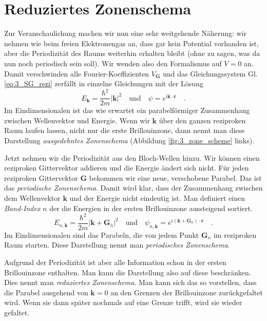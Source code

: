 \section{Reduziertes Zonenschema}

Zur Veranschaulichung machen wir nun eine sehr weitgehende Näherung: wir nehmen wie beim freien Elektronengas an, dass gar kein Potential vorhanden ist, aber die Periodizität des Raums weiterhin erhalten bleibt (ohne zu sagen, was da nun noch periodisch sein soll). Wir wenden also den Formalismus auf $V=0$ an. Damit verschwinden alle Fourier-Koeffizienten $V_\mathbf{G}$ und das Gleichungssystem Gl. \ref{eq:3_SG_rezi} zerfällt in einzelne Gleichungen mit der Lösung
\begin{equation}
    E_\mathbf{k} = \frac{\hbar^2}{2m} \left| \mathbf{k}  \right|^2 
    \quad \text{und} \quad 
    \psi = e^{i \mathbf{k} \cdot \mathbf{r}} \quad .
\end{equation}
Im Eindimensionalen ist das  wie erwartet ein parabelförmiger Zusammenhang zwischen Wellenvektor und Energie. Wenn wir $\mathbf{k}$ über den ganzen reziproken Raum laufen lassen, nicht nur die erste Brillouinzone, dann nennt man diese Darstellung \emph{ausgedehntes Zonenschema} (Abbildung  \ref{fig:3_zone_scheme} links).

Jetzt nehmen wir die Periodizität aus den Bloch-Wellen hinzu. Wir können einen reziproken Gittervektor addieren und die Energie ändert sich nicht. Für jeden reziproken Gittervektor $\mathbf{G}$ bekommen wir eine neue, verschobene Parabel. Das ist das \emph{periodische Zonenschema}. 
Damit wird klar, dass  der Zusammenhang zwischen dem Wellenvektor $\mathbf{k}$ und der Energie nicht eindeutig ist. Man definiert einen \emph{Band-Index} $n$ der die Energien in der ersten Brillouinzone aussteigend sortiert.
\begin{equation}
    E_{n,\mathbf{k}} 
     = \frac{\hbar^2}{2m} \left| \mathbf{k} + \mathbf{G}_n \right|^2 \quad \text{und} \quad \psi_{n,\mathbf{k}} = e^{i (\mathbf{k} + \mathbf{G}_n) \cdot \mathbf{r}} \quad .
\end{equation}
Im Eindimensionalen sind das Parabeln, die von jedem Punkt  $\mathbf{G}_n $ im reziproken Raum starten. Diese Darstellung nennt man \emph{periodisches Zonenschema}. 

Aufgrund der Periodizität ist aber alle Information schon in der ersten Brillouinzone enthalten. Man kann die Darstellung also auf diese beschränken. Dies nennt man  \emph{reduziertes Zonenschema}. Man kann sich das so vorstellen, dass die Parabel ausgehend von  $\mathbf{k} = 0$  an den Grenzen der Brillouinzone zurückgefaltet wird. Wenn sie dann später nochmals auf eine Grenze trifft, wird sie wieder gefaltet.


